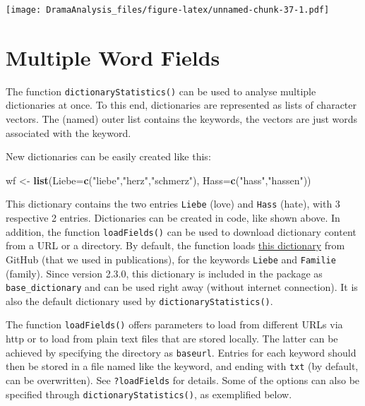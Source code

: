 \documentclass[]{book}
\newenvironment{Shaded}{\begin{snugshade}}{\end{snugshade}}
\newcommand{\DataTypeTok}[1]{\textcolor[rgb]{0.13,0.29,0.53}{#1}}
\newcommand{\KeywordTok}[1]{\textcolor[rgb]{0.13,0.29,0.53}{\textbf{#1}}}
\newcommand{\NormalTok}[1]{#1}
\newcommand{\StringTok}[1]{\textcolor[rgb]{0.31,0.60,0.02}{#1}}
\begin{document}
\texttt{[image: DramaAnalysis\_files/figure-latex/unnamed-chunk-37-1.pdf]}

\hypertarget{multiple-word-fields}{%
\section{Multiple Word Fields}\label{multiple-word-fields}}

The function \texttt{dictionaryStatistics()} can be used to analyse multiple dictionaries at once. To this end, dictionaries are represented as lists of character vectors. The (named) outer list contains the keywords, the vectors are just words associated with the keyword.

New dictionaries can be easily created like this:

\begin{Shaded}
\begin{Highlighting}[]
\NormalTok{wf <-}\StringTok{ }\KeywordTok{list}\NormalTok{(}\DataTypeTok{Liebe=}\KeywordTok{c}\NormalTok{(}\StringTok{"liebe"}\NormalTok{,}\StringTok{"herz"}\NormalTok{,}\StringTok{"schmerz"}\NormalTok{), }\DataTypeTok{Hass=}\KeywordTok{c}\NormalTok{(}\StringTok{"hass"}\NormalTok{,}\StringTok{"hassen"}\NormalTok{))}
\end{Highlighting}
\end{Shaded}

This dictionary contains the two entries \texttt{Liebe} (love) and \texttt{Hass} (hate), with 3 respective 2 entries. Dictionaries can be created in code, like shown above. In addition, the function \texttt{loadFields()} can be used to download dictionary content from a URL or a directory. By default, the function loads \href{https://github.com/quadrama/metadata/tree/master/fields/}{this dictionary} from GitHub (that we used in publications), for the keywords \texttt{Liebe} and \texttt{Familie} (family). Since version 2.3.0, this dictionary is included in the package as \texttt{base\_dictionary} and can be used right away (without internet connection). It is also the default dictionary used by \texttt{dictionaryStatistics()}.

The function \texttt{loadFields()} offers parameters to load from different URLs via http or to load from plain text files that are stored locally. The latter can be achieved by specifying the directory as \texttt{baseurl}. Entries for each keyword should then be stored in a file named like the keyword, and ending with \texttt{txt} (by default, can be overwritten). See \texttt{?loadFields} for details. Some of the options can also be specified through \texttt{dictionaryStatistics()}, as exemplified below.
\end{document}
